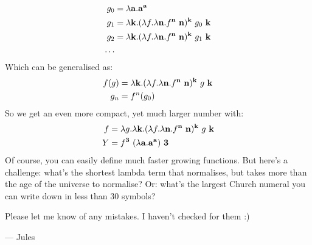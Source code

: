 \begin{align*}
  g_0 &= \lambda \ch{a}. \ch{a}^\ch{a}\\
  g_1 &= \lambda \ch{k}. (\lambda f. \lambda \ch{n}. f^\ch{n}\ \ch{n})^\ch{k}\ g_0\ \ch{k}\\
  g_2 &= \lambda \ch{k}. (\lambda f. \lambda \ch{n}. f^\ch{n}\ \ch{n})^\ch{k}\ g_1\ \ch{k}\\
  \dots
\end{align*}
Which can be generalised as:
\begin{align*}
  f(g) &= \lambda \ch{k}. (\lambda f. \lambda \ch{n}. f^\ch{n}\ \ch{n})^\ch{k}\ g\ \ch{k}\\
  g_n &= f^n(g_0)
\end{align*}
So we get an even more compact, yet much larger number with:
\begin{align*}
  f &= \lambda g. \lambda \mathbf{k}. (\lambda f. \lambda \mathbf{n}. f^{\mathbf{n}}\ \mathbf{n})^{\mathbf{k}}\ g\ \mathbf{k}\\
  Y &= f^{\mathbf{3}}\ (\lambda \mathbf{a}. \mathbf{a}^{\mathbf{a}})\ \mathbf{3}
\end{align*}
Of course, you can easily define much faster growing functions. But here's a challenge: what's the shortest lambda term that normalises, but takes more than the age of the universe to normalise? Or: what's the largest Church numeral you can write down in less than 30 symbols?

Please let me know of any mistakes. I haven't checked for them :)

--- Jules

